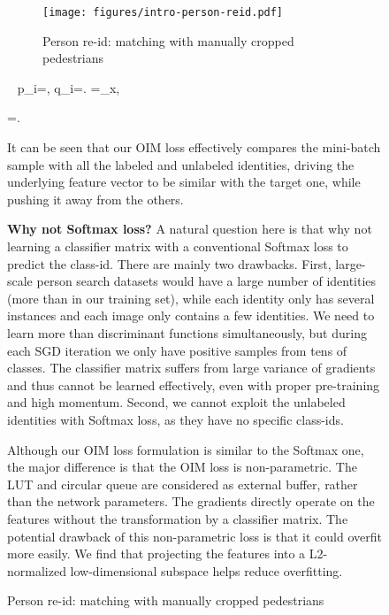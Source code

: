 \documentclass[10pt,twocolumn,letterpaper]{article}
\begin{document}
\begin{figure}[t]
\begin{center}
\begin{subfigure}[b]{\linewidth}
   \texttt{[image: figures/intro-person-reid.pdf]}
   \caption{Person re-id: matching with manually cropped pedestrians}
   \label{fig:intro-person-reid}
\end{subfigure}
\ \label{eq:pi}
p_i=,
 \label{eq:qi}
q_i=.
 \label{eq:loglik}
=_x,

=\left[(1-p_t)v_t - \sum_{\substack{j=1\\j\ne t}}^L p_j v_j - \sum_{k=1}^Q q_k u_k\right].


It can be seen that our OIM loss effectively compares the mini-batch sample with all the labeled and unlabeled identities, driving the underlying feature vector to be similar with the target one, while pushing it away from the others.

\textbf{Why not Softmax loss?} A natural question here is that why not learning a classifier matrix with a conventional Softmax loss to predict the class-id. There are mainly two drawbacks. First, large-scale person search datasets would have a large number of identities (more than  in our training set), while each identity only has several instances and each image only contains a few identities. We need to learn more than  discriminant functions simultaneously, but during each SGD iteration we only have positive samples from tens of classes. The classifier matrix suffers from large variance of gradients and thus cannot be learned effectively, even with proper pre-training and high momentum. Second, we cannot exploit the unlabeled identities with Softmax loss, as they have no specific class-ids.

Although our OIM loss formulation is similar to the Softmax one, the major difference is that the OIM loss is non-parametric. The LUT and circular queue are considered as external buffer, rather than the network parameters. The gradients directly operate on the features without the transformation by a classifier matrix. The potential drawback of this non-parametric loss is that it could overfit more easily. We find that projecting the features into a L2-normalized low-dimensional subspace helps reduce overfitting.


\end{center}
\end{figure}
\end{document}
